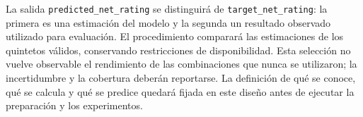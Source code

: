 La salida \texttt{predicted\_net\_rating} se distinguirá de \texttt{target\_net\_rating}: la primera es una estimación del modelo y la segunda un resultado observado utilizado para evaluación. El procedimiento comparará las estimaciones de los quintetos válidos, conservando restricciones de disponibilidad. Esta selección no vuelve observable el rendimiento de las combinaciones que nunca se utilizaron; la incertidumbre y la cobertura deberán reportarse. La definición de qué se conoce, qué se calcula y qué se predice quedará fijada en este diseño antes de ejecutar la preparación y los experimentos.
